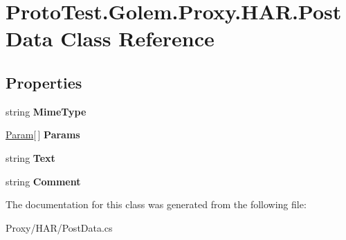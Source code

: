 \hypertarget{class_proto_test_1_1_golem_1_1_proxy_1_1_h_a_r_1_1_post_data}{\section{Proto\-Test.\-Golem.\-Proxy.\-H\-A\-R.\-Post\-Data Class Reference}
\label{class_proto_test_1_1_golem_1_1_proxy_1_1_h_a_r_1_1_post_data}
}
\subsection*{Properties}
\begin{DoxyCompactItemize}
\item 
\hypertarget{class_proto_test_1_1_golem_1_1_proxy_1_1_h_a_r_1_1_post_data_a435be1421e83f51c288995e6d68b53e7}{string {\bfseries Mime\-Type}}\label{class_proto_test_1_1_golem_1_1_proxy_1_1_h_a_r_1_1_post_data_a435be1421e83f51c288995e6d68b53e7}

\item 
\hypertarget{class_proto_test_1_1_golem_1_1_proxy_1_1_h_a_r_1_1_post_data_a4577bdcda6074fe217f73668c6eff4a8}{\hyperlink{class_proto_test_1_1_golem_1_1_proxy_1_1_h_a_r_1_1_param}{Param}\mbox{[}$\,$\mbox{]} {\bfseries Params}}\label{class_proto_test_1_1_golem_1_1_proxy_1_1_h_a_r_1_1_post_data_a4577bdcda6074fe217f73668c6eff4a8}

\item 
\hypertarget{class_proto_test_1_1_golem_1_1_proxy_1_1_h_a_r_1_1_post_data_a3413f7eeb8228e4a1cf1004969174f66}{string {\bfseries Text}}\label{class_proto_test_1_1_golem_1_1_proxy_1_1_h_a_r_1_1_post_data_a3413f7eeb8228e4a1cf1004969174f66}

\item 
\hypertarget{class_proto_test_1_1_golem_1_1_proxy_1_1_h_a_r_1_1_post_data_a913e6fa63714671ef8fe41d95caab8e2}{string {\bfseries Comment}}\label{class_proto_test_1_1_golem_1_1_proxy_1_1_h_a_r_1_1_post_data_a913e6fa63714671ef8fe41d95caab8e2}

\end{DoxyCompactItemize}


The documentation for this class was generated from the following file\-:\begin{DoxyCompactItemize}
\item 
Proxy/\-H\-A\-R/Post\-Data.\-cs\end{DoxyCompactItemize}
